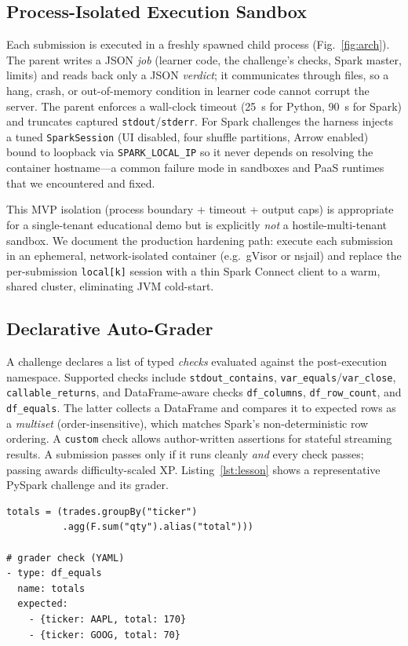 \documentclass[10pt,twocolumn,letterpaper]{article}
\newcommand{\code}[1]{\texttt{\small #1}}
\begin{document}
\subsection{Process-Isolated Execution Sandbox}
\label{sec:sandbox}
Each submission is executed in a freshly spawned child process (Fig.~\ref{fig:arch}).
The parent writes a JSON \emph{job} (learner code, the challenge's checks, Spark
master, limits) and reads back only a JSON \emph{verdict}; it communicates through
files, so a hang, crash, or out-of-memory condition in learner code cannot corrupt
the server. The parent enforces a wall-clock timeout (25~s for Python, 90~s for
Spark) and truncates captured \code{stdout}/\code{stderr}. For Spark challenges the
harness injects a tuned \code{SparkSession} (UI disabled, four shuffle partitions,
Arrow enabled) bound to loopback via \code{SPARK\_LOCAL\_IP} so it never depends on
resolving the container hostname---a common failure mode in sandboxes and PaaS
runtimes that we encountered and fixed.

This MVP isolation (process boundary + timeout + output caps) is appropriate for a
single-tenant educational demo but is explicitly \emph{not} a hostile-multi-tenant
sandbox. We document the production hardening path: execute each submission in an
ephemeral, network-isolated container (e.g.\ gVisor or nsjail) and replace the
per-submission \code{local[k]} session with a thin Spark
Connect client to a warm, shared cluster, eliminating JVM cold-start.

\subsection{Declarative Auto-Grader}
\label{sec:grader}
A challenge declares a list of typed \emph{checks} evaluated against the
post-execution namespace. Supported checks include \code{stdout\_contains},
\code{var\_equals}/\code{var\_close}, \code{callable\_returns}, and DataFrame-aware
checks \code{df\_columns}, \code{df\_row\_count}, and \code{df\_equals}. The latter
collects a DataFrame and compares it to expected rows as a \emph{multiset}
(order-insensitive), which matches Spark's non-deterministic row ordering. A
\code{custom} check allows author-written assertions for stateful streaming
results. A submission passes only if it runs cleanly \emph{and} every check passes;
passing awards difficulty-scaled XP. Listing~\ref{lst:lesson} shows a representative
PySpark challenge and its grader.

\begin{lstlisting}[caption={A PySpark group-by challenge: learner solution (top)
and the declarative grader check (bottom).},label={lst:lesson}]
totals = (trades.groupBy("ticker")
          .agg(F.sum("qty").alias("total")))

# grader check (YAML)
- type: df_equals
  name: totals
  expected:
    - {ticker: AAPL, total: 170}
    - {ticker: GOOG, total: 70}
\end{lstlisting}
\end{document}

